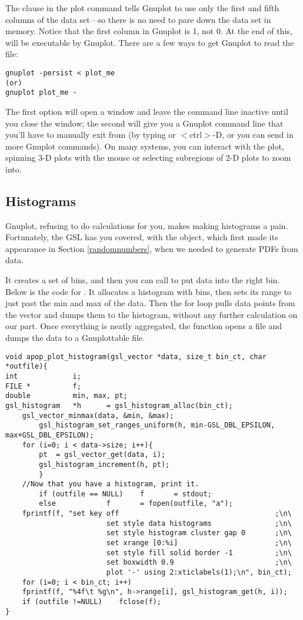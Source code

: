 The clause  in the plot command tells Gnuplot to use
only the first and fifth columns of the data set---so there is no need to pare
down the data set in memory. Notice that the first column in Gnuplot is
1, not 0. At the end of this,  will be executable by
Gnuplot. There are a few ways to get Gnuplot to read the file:
\begin{lstlisting}
gnuplot -persist < plot_me
(or)
gnuplot plot_me -
\end{lstlisting}
The first option will open a window and leave the command line inactive
until you close the window;
the second will give you a Gnuplot command line that you'll have to
manually exit
from (by typing  or $<$ctrl$>$-D, or you can send in more
Gnuplot commands). On many systems, you can
interact with the plot, spinning 3-D plots with the mouse or selecting
subregions of 2-D plots to zoom into.

\subsection{Histograms} Gnuplot, refusing to do calculations for you,
makes making histograms a pain.  Fortunately, the GSL has you covered,
with the  object, which first made its appearance
in Section \ref{randomnumbers}, when we needed to generate PDFs from data.

It creates a set of bins, and
then you can call  to put
data into the right bin. Below is the code for . 
It allocates a histogram with
 bins, then sets its range to just past the min and max
of the data. Then the for loop pulls data points from the vector and
dumps them to the histogram, without any further calculation on our part.
Once everything is neatly aggregated, the function opens a file and dumps the data to a Gnuplottable file.
\begin{lstlisting}
void apop_plot_histogram(gsl_vector *data, size_t bin_ct, char *outfile){
int             i;
FILE *          f;
double          min, max, pt;
gsl_histogram   *h      = gsl_histogram_alloc(bin_ct);
    gsl_vector_minmax(data, &min, &max);
        gsl_histogram_set_ranges_uniform(h, min-GSL_DBL_EPSILON, max+GSL_DBL_EPSILON);
    for (i=0; i < data->size; i++){
        pt  = gsl_vector_get(data, i);
        gsl_histogram_increment(h, pt);
        }
    //Now that you have a histogram, print it.
        if (outfile == NULL)    f       = stdout;
        else            f       = fopen(outfile, "a");
    fprintf(f, "set key off                                     ;\n\
                        set style data histograms               ;\n\
                        set style histogram cluster gap 0       ;\n\
                        set xrange [0:%i]                       ;\n\
                        set style fill solid border -1          ;\n\
                        set boxwidth 0.9                        ;\n\
                        plot '-' using 2:xticlabels(1);\n", bin_ct);
    for (i=0; i < bin_ct; i++)
    fprintf(f, "%4f\t %g\n", h->range[i], gsl_histogram_get(h, i));
    if (outfile !=NULL)    fclose(f);
}
\end{lstlisting}
\index{Gnuplot|)}
